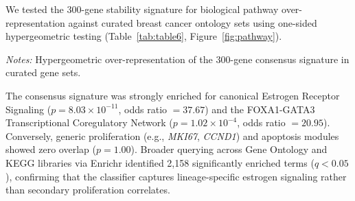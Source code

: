 \documentclass[11pt,a4paper]{article}
\begin{document}
We tested the 300-gene stability signature for biological pathway over-representation against curated breast cancer ontology sets using one-sided hypergeometric testing (Table~\ref{tab:table6}, Figure~\ref{fig:pathway}).

\begin{table}[H]
\centering
\small
\caption{Curated Biological Pathway Overlap and Functional Enrichment.}
\label{tab:table6}
\par\vspace{4pt}
\begin{flushleft}
\footnotesize
\textit{Notes:} Hypergeometric over-representation of the 300-gene consensus signature in curated gene sets.
\end{flushleft}
\end{table}

The consensus signature was strongly enriched for canonical Estrogen Receptor Signaling ($p = 8.03 \times 10^{-11}$, odds ratio $= 37.67$) and the FOXA1-GATA3 Transcriptional Coregulatory Network ($p = 1.02 \times 10^{-4}$, odds ratio $= 20.95$). Conversely, generic proliferation (e.g., \textit{MKI67}, \textit{CCND1}) and apoptosis modules showed zero overlap ($p = 1.00$). Broader querying across Gene Ontology and KEGG libraries via Enrichr identified 2,158 significantly enriched terms ($q < 0.05$), confirming that the classifier captures lineage-specific estrogen signaling rather than secondary proliferation correlates.
\end{document}
